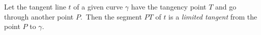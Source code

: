 \documentclass[12pt]{article}
\begin{document}
Let the tangent line $t$ of a given curve $\gamma$ have the tangency point $T$ and go through another point $P$. \,Then the segment $PT$ of $t$ is a {\em limited tangent} from the point $P$ to $\gamma$.
\end{document}
